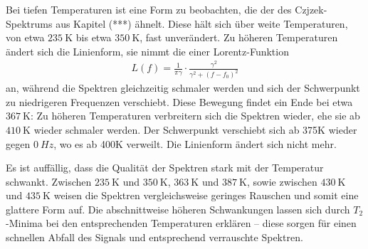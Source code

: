 Bei tiefen Temperaturen ist eine Form zu beobachten, die der des Czjzek-Spektrums aus Kapitel (***) ähnelt. Diese hält sich über weite Temperaturen, von etwa $\SI{235}{\kelvin}$ bis etwa $\SI{350}{\kelvin}$, fast unverändert. Zu höheren Temperaturen ändert sich die Linienform, sie nimmt die einer Lorentz-Funktion
\begin{align}
	L(f) = \frac{1}{\pi \gamma} \cdot \frac{\gamma^2}{\gamma^2 + (f - f_0)^2} \label{eqn:res:lorentz}
\end{align}
an, während die Spektren gleichzeitig schmaler werden und sich der Schwerpunkt zu niedrigeren Frequenzen verschiebt. Diese Bewegung findet ein Ende bei etwa $\SI{367}{\kelvin}$: Zu höheren Temperaturen verbreitern sich die Spektren wieder, ehe sie ab $\SI{410}{\kelvin}$ wieder schmaler werden. Der Schwerpunkt verschiebt sich ab 375K wieder gegen $\SI{0}{Hz}$, wo es ab 400K verweilt. Die Linienform ändert sich nicht mehr.

Es ist auffällig, dass die Qualität der Spektren stark mit der Temperatur schwankt. Zwischen $\SI{235}{\kelvin}$ und $\SI{350}{\kelvin}$, $\SI{363}{\kelvin}$ und $\SI{387}{\kelvin}$, sowie zwischen $\SI{430}{\kelvin}$ und $\SI{435}{\kelvin}$ weisen die Spektren vergleichsweise geringes Rauschen und somit eine glattere Form auf. Die abschnittweise höheren Schwankungen lassen sich durch $T_2$-Minima bei den entsprechenden Temperaturen erklären -- diese sorgen für einen schnellen Abfall des Signals und entsprechend verrauschte Spektren.

